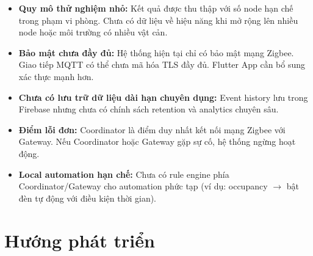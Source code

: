 \begin{itemize}
    \item \textbf{Quy mô thử nghiệm nhỏ:} Kết quả được thu thập với số node hạn chế trong phạm vi phòng. Chưa có dữ liệu về hiệu năng khi mở rộng lên nhiều node hoặc môi trường có nhiều vật cản.
    
    \item \textbf{Bảo mật chưa đầy đủ:} Hệ thống hiện tại chỉ có bảo mật mạng Zigbee. Giao tiếp MQTT có thể chưa mã hóa TLS đầy đủ. Flutter App cần bổ sung xác thực mạnh hơn.
    
    \item \textbf{Chưa có lưu trữ dữ liệu dài hạn chuyên dụng:} Event history lưu trong Firebase nhưng chưa có chính sách retention và analytics chuyên sâu.
    
    \item \textbf{Điểm lỗi đơn:} Coordinator là điểm duy nhất kết nối mạng Zigbee với Gateway. Nếu Coordinator hoặc Gateway gặp sự cố, hệ thống ngừng hoạt động.
    
    \item \textbf{Local automation hạn chế:} Chưa có rule engine phía Coordinator/Gateway cho automation phức tạp (ví dụ: occupancy $\rightarrow$ bật đèn tự động với điều kiện thời gian).
\end{itemize}

\section{Hướng phát triển}
\label{sec:ch5-huongphattrien}

